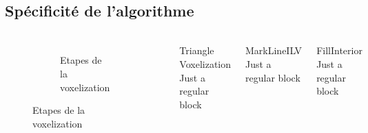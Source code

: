 \subsection{Spécificité de l'algorithme}

\begin{frame}[fragile=singleslide]{\insertsectionhead}

  \framesubtitle{\insertsubsectionhead}
  \begin{columns}[T,onlytextwidth]
    \vspace{0.8cm}
    \begin{figure}
      \begin{subfigure}{5.5\textwidth}
        \caption*{Etapes de la voxelization}
      \end{subfigure}
    \end{figure}
    \begin{block}{Triangle Voxelization}
        Just a regular block
    \end{block}
    \begin{block}{MarkLineILV}
        Just a regular block
    \end{block}
    \begin{block}{FillInterior}
        Just a regular block
    \end{block}
  \end{columns}
\end{frame}

